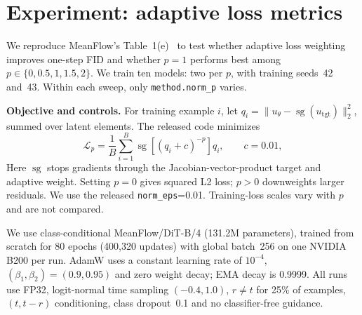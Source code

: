 
\section{Experiment: adaptive loss metrics}
\label{sec:loss-metrics}

We reproduce MeanFlow's Table~1(e)~\cite{meanflow} to test whether adaptive loss weighting improves one-step FID and whether $p=1$ performs best among $p\in\{0,0.5,1,1.5,2\}$. We train ten models: two per $p$, with training seeds~42 and~43. Within each sweep, only \texttt{method.norm\_p} varies.

\textbf{Objective and controls.}
For training example $i$, let $q_i=\|u_\theta-\operatorname{sg}(u_{\mathrm{tgt}})\|_2^2$, summed over latent elements. The released code minimizes
\begin{equation}
  \mathcal{L}_p=\frac{1}{B}\sum_{i=1}^{B}
  \operatorname{sg}\!\left[(q_i+c)^{-p}\right]q_i,
  \qquad c=0.01,
  \label{eq:adaptive-loss}
\end{equation}
Here $\operatorname{sg}$ stops gradients through the Jacobian-vector-product target and adaptive weight. Setting $p=0$ gives squared L2 loss; $p>0$ downweights larger residuals. We use the released \texttt{norm\_eps}=0.01. Training-loss scales vary with $p$ and are not compared.

We use class-conditional MeanFlow/DiT-B/4 (131.2M parameters), trained from scratch for 80 epochs (400,320 updates) with global batch~256 on one NVIDIA B200 per run. AdamW uses a constant learning rate of $10^{-4}$, $(\beta_1,\beta_2)=(0.9,0.95)$ and zero weight decay; EMA decay is 0.9999. All runs use FP32, logit-normal time sampling $(-0.4,1.0)$, $r\ne t$ for 25\% of examples, $(t,t-r)$ conditioning, class dropout~0.1 and no classifier-free guidance.

